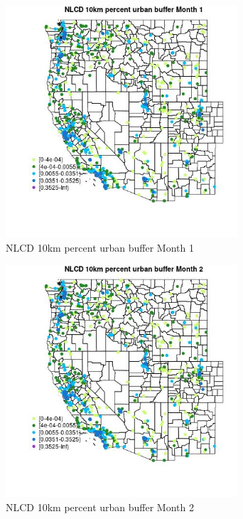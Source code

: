 \begin{figure} 
\centering  
\includegraphics[width=0.77\textwidth]{Code_Outputs/Report_ML_input_PM25_Step4_part_e_de_duplicated_aves_compiled_2019-05-21wNAs_MapObsMo1NLCD_10km_percent_urban_buffer.jpg} 
\caption{\label{fig:Report_ML_input_PM25_Step4_part_e_de_duplicated_aves_compiled_2019-05-21wNAsMapObsMo1NLCD_10km_percent_urban_buffer}NLCD 10km percent urban buffer Month 1} 
\end{figure} 
 

\clearpage 

\begin{figure} 
\centering  
\includegraphics[width=0.77\textwidth]{Code_Outputs/Report_ML_input_PM25_Step4_part_e_de_duplicated_aves_compiled_2019-05-21wNAs_MapObsMo2NLCD_10km_percent_urban_buffer.jpg} 
\caption{\label{fig:Report_ML_input_PM25_Step4_part_e_de_duplicated_aves_compiled_2019-05-21wNAsMapObsMo2NLCD_10km_percent_urban_buffer}NLCD 10km percent urban buffer Month 2} 
\end{figure} 
 

